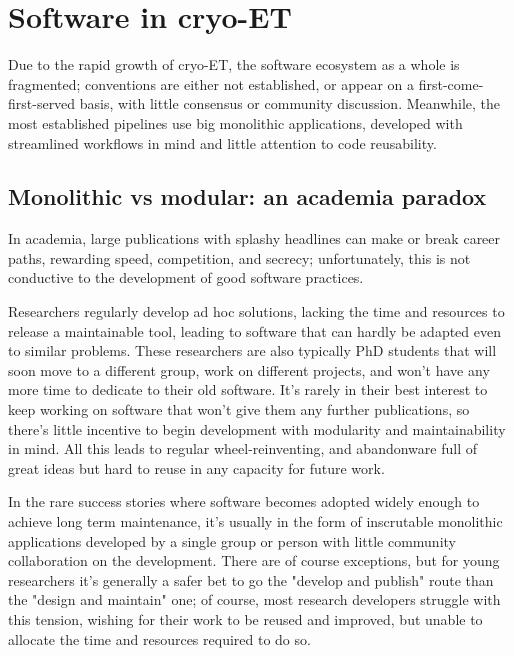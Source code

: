 \chapter{Software in cryo-ET}\label{software}

Due to the rapid growth of cryo-ET, the software ecosystem as a whole is fragmented; conventions are either not established, or appear on a first-come-first-served basis, with little consensus or community discussion.
Meanwhile, the most established pipelines use big monolithic applications, developed with streamlined workflows in mind and little attention to code reusability.

\localtableofcontents

\section{Monolithic vs modular: an academia paradox}

In academia, large publications with splashy headlines can make or break career paths, rewarding speed, competition, and secrecy; unfortunately, this is not conductive to the development of good software practices.

Researchers regularly develop ad hoc solutions, lacking the time and resources to release a maintainable tool, leading to software that can hardly be adapted even to similar problems.
These researchers are also typically PhD students that will soon move to a different group, work on different projects, and won't have any more time to dedicate to their old software.
It's rarely in their best interest to keep working on software that won't give them any further publications, so there's little incentive to begin development with modularity and maintainability in mind. 
All this leads to regular wheel-reinventing, and abandonware full of great ideas but hard to reuse in any capacity for future work.

In the rare success stories where software becomes adopted widely enough to achieve long term maintenance, it's usually in the form of inscrutable monolithic applications developed by a single group or person with little community collaboration on the development.
There are of course exceptions, but for young researchers it's generally a safer bet to go the "develop and publish" route than the "design and maintain" one; of course, most research developers struggle with this tension, wishing for their work to be reused and improved, but unable to allocate the time and resources required to do so.

